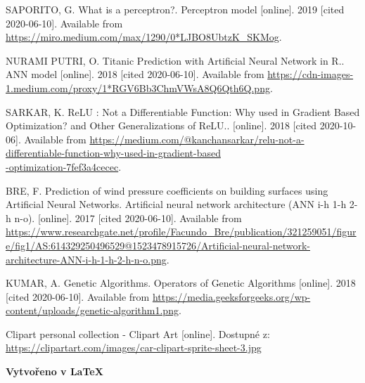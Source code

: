 \documentclass[a4paper,12pt]{article}
\begin{document}
    \bigskip
    \tableofcontents
    \listoffigures

    \begin{thebibliography}{6}
            SAPORITO, G. What is a perceptron?. Perceptron model [online]. 2019 [cited 2020-06-10]. 
            Available from \url{https://miro.medium.com/max/1290/0*LJBO8UbtzK_SKMog}.

            NURAMI PUTRI, O. Titanic Prediction with Artificial Neural Network in R.. ANN model 
            [online]. 2018 [cited 2020-06-10]. Available from \url{https://cdn-images-1.medium.com/proxy/1*RGV6Bb3ChmVWsA8Q6Qth6Q.png}.

            SARKAR, K. ReLU : Not a Differentiable Function: 
            Why used in Gradient Based Optimization? and Other Generalizations of ReLU.. [online]. 
            2018 [cited 2020-10-06]. Available from \url{https://medium.com/@kanchansarkar/relu-not-a-differentiable-function-why-used-in-gradient-based}\\\url{-optimization-7fef3a4cecec}.

            BRE, F. Prediction of wind pressure coefficients on building surfaces using 
            Artificial Neural Networks. Artificial neural network architecture (ANN i-h 1-h 2-h n-o). 
            [online]. 2017 [cited 2020-06-10]. Available from \url{https://www.researchgate.net/profile/Facundo_Bre/publication/321259051/figure/fig1/AS:614329250496529@1523478915726/Artificial-neural-network-architecture-ANN-i-h-1-h-2-h-n-o.png}.

            KUMAR, A. Genetic Algorithms. Operators of Genetic Algorithms [online]. 2018 
            [cited 2020-06-10]. Available from \url{https://media.geeksforgeeks.org/wp-content/uploads/genetic-algorithm1.png}.

            Clipart personal collection - Clipart Art [online]. 
            Dostupné z: \url{https://clipartart.com/images/car-clipart-sprite-sheet-3.jpg}

    \end{thebibliography}

    \vspace{2em}
    \begin{center}
        \footnotesize{
            \textbf{Vytvořeno v \LaTeX}
        }
    \end{center}
\end{document}
